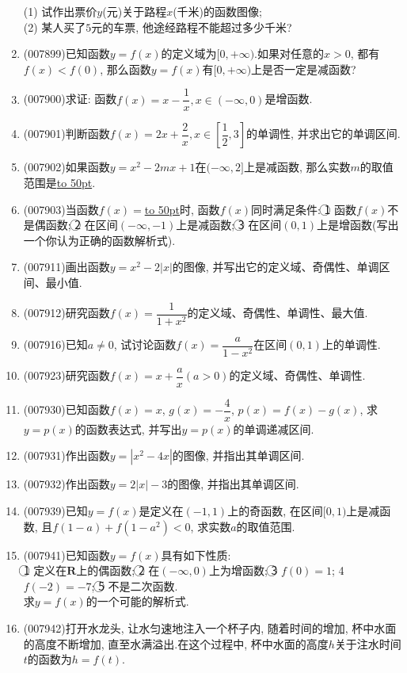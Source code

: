 \documentclass[10pt,a4paper]{article}
\newcommand{\blank}[1]{\underline{\hbox to #1pt{}}}
\begin{document}
\begin{enumerate}[1.]
(1) 试作出票价$y$(元)关于路程$x$(千米)的函数图像;\\
(2) 某人买了$5$元的车票, 他途经路程不能超过多少千米?
\item {\tiny (007899)}已知函数$y=f(x)$的定义域为$[0,+\infty)$.如果对任意的$x>0$, 都有$f(x)<f(0)$, 那么函数$y=f(x)$有$[0,+\infty)$上是否一定是减函数?
\item {\tiny (007900)}求证: 函数$f(x)=x-\dfrac 1x,x\in (-\infty ,0)$是增函数.
\item {\tiny (007901)}判断函数$f(x)=2x+\dfrac 2x,x\in [\dfrac 12,3]$的单调性, 并求出它的单调区间.
\item {\tiny (007902)}如果函数$y=x^2-2mx+1$在$(-\infty ,2]$上是减函数, 那么实数$m$的取值范围是\blank{50}.
\item {\tiny (007903)}当函数$f(x)=$\blank{50}时, 函数$f(x)$同时满足条件: \textcircled{1} 函数$f(x)$不是偶函数; \textcircled{2} 在区间$(-\infty ,-1)$上是减函数; \textcircled{3} 在区间$(0,1)$上是增函数(写出一个你认为正确的函数解析式).
\item {\tiny (007911)}画出函数$y=x^2-2|x|$的图像, 并写出它的定义域、奇偶性、单调区间、最小值.
\item {\tiny (007912)}研究函数$f(x)=\dfrac 1{1+x^2}$的定义域、奇偶性、单调性、最大值.
\item {\tiny (007916)}已知$a\ne 0$, 试讨论函数$f(x)=\dfrac a{1-x^2}$在区间$(0,1)$上的单调性.
\item {\tiny (007923)}研究函数$f(x)=x+\dfrac ax(a>0)$的定义域、奇偶性、单调性.
\item {\tiny (007930)}已知函数$f(x)=x$, $g(x)=-\dfrac 4x$, $p(x)=f(x)-g(x)$, 求$y=p(x)$的函数表达式, 并写出$y=p(x)$的单调递减区间.
\item {\tiny (007931)}作出函数$y=|x^2-4x|$的图像, 并指出其单调区间.
\item {\tiny (007932)}作出函数$y=2|x|-3$的图像, 并指出其单调区间.
\item {\tiny (007939)}已知$y=f(x)$是定义在$(-1,1)$上的奇函数, 在区间$[0,1)$上是减函数, 且$f(1-a)+f(1-a^2)<0$, 求实数$a$的取值范围.
\item {\tiny (007941)}已知函数$y=f(x)$具有如下性质:\\
\textcircled{1} 定义在$\mathbf{R}$上的偶函数; \textcircled{2} 在$(-\infty ,0)$上为增函数; \textcircled{3} $f(0)=1$; \textcircled{4} $f(-2)=-7$; \textcircled{5} 不是二次函数.\\
求$y=f(x)$的一个可能的解析式.
\item {\tiny (007942)}打开水龙头, 让水匀速地注入一个杯子内, 随着时间的增加, 杯中水面的高度不断增加, 直至水满溢出.在这个过程中, 杯中水面的高度$h$关于注水时间$t$的函数为$h=f(t)$.

\end{enumerate}
\end{document}
